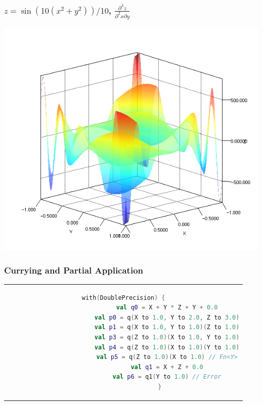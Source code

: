 \documentclass{beamer}
\begin{document}
    \begin{frame}
        \frametitle{$z = \sin(10(x^2 + y^2)) / 10$, $\frac{\partial^3 z}{\partial^2 x \partial y}$}
        \begin{center}
            \includegraphics[scale=0.4]{../figures/plot3d.png}
        \end{center}
    \end{frame}

    \begin{frame}[fragile]
        \frametitle{Currying and Partial Application}
        \begin{center}
            \begin{tabular}{c}
                \begin{lstlisting}[language=Kotlin, gobble=20]
                    with(DoublePrecision) {
                        val q0 = X + Y * Z + Y + 0.0
                        val p0 = q(X to 1.0, Y to 2.0, Z to 3.0)
                        val p1 = q(X to 1.0, Y to 1.0)(Z to 1.0)
                        val p3 = q(Z to 1.0)(X to 1.0, Y to 1.0)
                        val p4 = q(Z to 1.0)(X to 1.0)(Y to 1.0)
                        val p5 = q(Z to 1.0)(X to 1.0) // Fn<Y>
                        val q1 = X + Z + 0.0
                        val p6 = q1(Y to 1.0) // Error
                    }
                \end{lstlisting}
            \end{tabular}
        \end{center}
    \end{frame}
\end{document}
